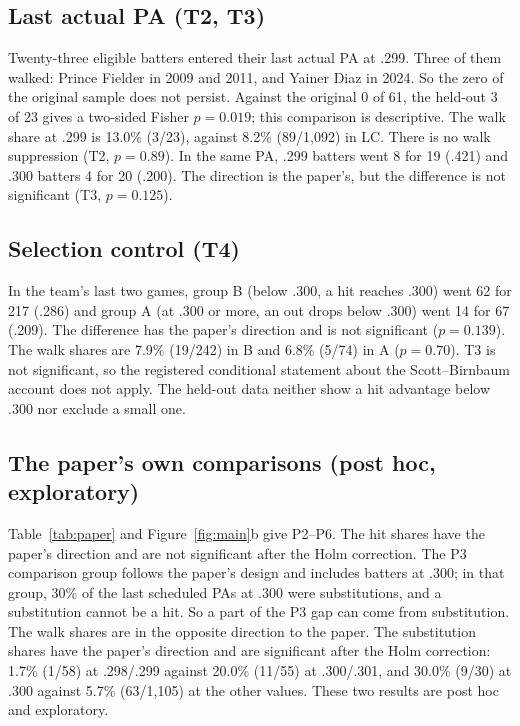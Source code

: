 \documentclass[11pt]{article}
\begin{document}
\subsection{Last actual PA (T2, T3)}

Twenty-three eligible batters entered their last actual PA at .299. Three of them walked: Prince Fielder in 2009 and 2011, and Yainer Diaz in 2024. So the zero of the original sample does not persist. Against the original 0 of 61, the held-out 3 of 23 gives a two-sided Fisher $p = 0.019$; this comparison is descriptive. The walk share at .299 is 13.0\% (3/23), against 8.2\% (89/1,092) in LC. There is no walk suppression (T2, $p = 0.89$). In the same PA, .299 batters went 8 for 19 (.421) and .300 batters 4 for 20 (.200). The direction is the paper's, but the difference is not significant (T3, $p = 0.125$).

\subsection{Selection control (T4)}

In the team's last two games, group B (below .300, a hit reaches .300) went 62 for 217 (.286) and group A (at .300 or more, an out drops below .300) went 14 for 67 (.209). The difference has the paper's direction and is not significant ($p = 0.139$). The walk shares are 7.9\% (19/242) in B and 6.8\% (5/74) in A ($p = 0.70$). T3 is not significant, so the registered conditional statement about the Scott--Birnbaum account does not apply. The held-out data neither show a hit advantage below .300 nor exclude a small one.

\subsection{The paper's own comparisons (post hoc, exploratory)}

Table~\ref{tab:paper} and Figure~\ref{fig:main}b give P2--P6. The hit shares have the paper's direction and are not significant after the Holm correction. The P3 comparison group follows the paper's design and includes batters at .300; in that group, 30\% of the last scheduled PAs at .300 were substitutions, and a substitution cannot be a hit. So a part of the P3 gap can come from substitution. The walk shares are in the opposite direction to the paper. The substitution shares have the paper's direction and are significant after the Holm correction: 1.7\% (1/58) at .298/.299 against 20.0\% (11/55) at .300/.301, and 30.0\% (9/30) at .300 against 5.7\% (63/1,105) at the other values. These two results are post hoc and exploratory.
\end{document}
